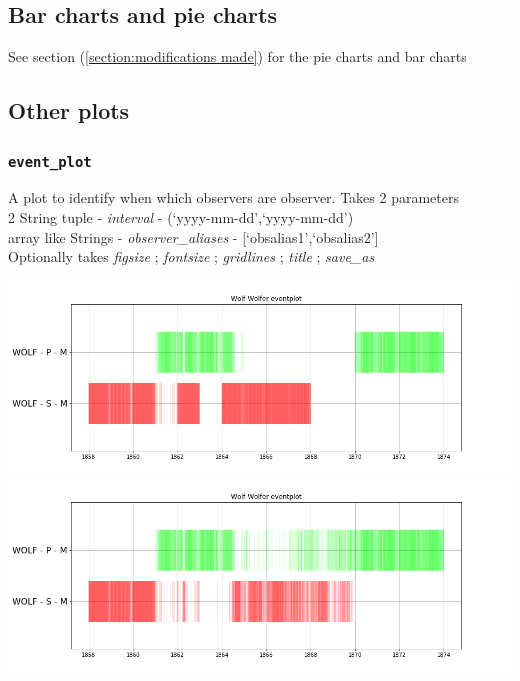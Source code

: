\documentclass[12pt]{article}
\begin{document}
\subsection{Bar charts and pie charts}

See section (\ref{section:modifications made}) for the pie charts and bar charts

\subsection{Other plots}
\subsubsection{\texttt{event\_plot}}
A plot to identify when which observers are observer. Takes 2 parameters\\
2 String tuple - \textit{interval} - (`yyyy-mm-dd',`yyyy-mm-dd')\\
array like Strings - \textit{observer\_aliases} - [`obsalias1',`obsalias2']\\
Optionally takes \textit{figsize} ; \textit{fontsize} ; \textit{gridlines} ; \textit{title} ; \textit{save\_as}\\

{\centering
{}
\includegraphics[width=\linewidth]{wolfSP_58_74_before.png}
\includegraphics[width=\linewidth]{wolfSP_58_74_after.png}
\label{fig:event plots wolf before and after}
\par}
\end{document}
